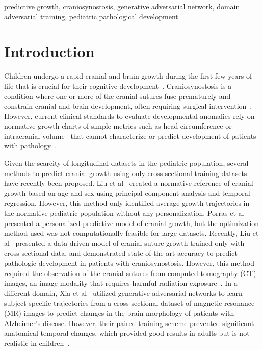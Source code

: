 \documentclass[conference]{IEEEtran}
\begin{document}
\begin{IEEEkeywords}
predictive growth, craniosynostosis, generative adversarial network, domain adversarial training, pediatric pathological development
\end{IEEEkeywords}

\section{Introduction}
Children undergo a rapid cranial and brain growth during the first few years of life that is crucial for their cognitive development~\cite{Cao2017Developmental}. Craniosynostosis is a condition where one or more of the cranial sutures fuse prematurely and constrain cranial and brain development, often requiring surgical intervention~\cite{Mathijssen2021Updated}. However, current clinical standards to evaluate developmental anomalies rely on normative growth charts of simple metrics such as head circumference or intracranial volume~\cite{Meyer-Marcotty2014Three-dimensional, Rollins2010United} that cannot characterize or predict development of patients with pathology~\cite{Breakey2018Intracranial, Thakkar2018Observer}.

Given the scarcity of longitudinal datasets in the pediatric population, several methods to predict cranial growth using only cross-sectional training datasets have recently been proposed. Liu et al~\cite{Liu2022Data-driven} created a normative reference of cranial growth based on age and sex using principal component analysis and temporal regression. However, this method only identified average growth trajectories in the normative pediatric population without any personalization. Porras et al~\cite{Porras2022Predictive} presented a personalized predictive model of cranial growth, but the optimization method used was not computationally feasible for large datasets. Recently, Liu et al~\cite{Liu2023Data-driven} presented a data-driven model of cranial suture growth trained only with cross-sectional data, and demonstrated state-of-the-art accuracy to predict pathologic development in patients with craniosynostosis. However, this method required the observation of the cranial sutures from computed tomography (CT) images, an image modality that requires harmful radiation exposure~\cite{Schweitzer2012Avoiding}. In a different domain, Xia et al~\cite{Xia2021Learning} utilized generative adversarial networks to learn subject-specific trajectories from a cross-sectional dataset of magnetic resonance (MR) images to predict changes in the brain morphology of patients with Alzheimer’s disease. However, their paired training scheme prevented significant anatomical temporal changes, which provided good results in adults but is not realistic in children~\cite{Meyer-Marcotty2014Three-dimensional}.
\end{document}
